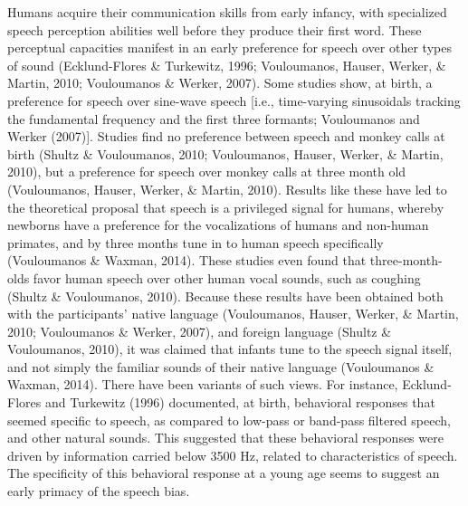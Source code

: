 \documentclass[
  english,
  man]{apa6}
\begin{document}
Humans acquire their communication skills from early infancy, with specialized speech perception abilities well before they produce their first word. These perceptual capacities manifest in an early preference for speech over other types of sound (Ecklund-Flores \& Turkewitz, 1996; Vouloumanos, Hauser, Werker, \& Martin, 2010; Vouloumanos \& Werker, 2007). Some studies show, at birth, a preference for speech over sine-wave speech {[}i.e., time-varying sinusoidals tracking the fundamental frequency and the first three formants; Vouloumanos and Werker (2007){]}. Studies find no preference between speech and monkey calls at birth (Shultz \& Vouloumanos, 2010; Vouloumanos, Hauser, Werker, \& Martin, 2010), but a preference for speech over monkey calls at three month old (Vouloumanos, Hauser, Werker, \& Martin, 2010). Results like these have led to the theoretical proposal that speech is a privileged signal for humans, whereby newborns have a preference for the vocalizations of humans and non-human primates, and by three months tune in to human speech specifically (Vouloumanos \& Waxman, 2014). These studies even found that three-month-olds favor human speech over other human vocal sounds, such as coughing (Shultz \& Vouloumanos, 2010). Because these results have been obtained both with the participants' native language (Vouloumanos, Hauser, Werker, \& Martin, 2010; Vouloumanos \& Werker, 2007), and foreign language (Shultz \& Vouloumanos, 2010), it was claimed that infants tune to the speech signal itself, and not simply the familiar sounds of their native language (Vouloumanos \& Waxman, 2014). There have been variants of such views. For instance, Ecklund-Flores and Turkewitz (1996) documented, at birth, behavioral responses that seemed specific to speech, as compared to low-pass or band-pass filtered speech, and other natural sounds. This suggested that these behavioral responses were driven by information carried below 3500 Hz, related to characteristics of speech. The specificity of this behavioral response at a young age seems to suggest an early primacy of the speech bias.
\end{document}
